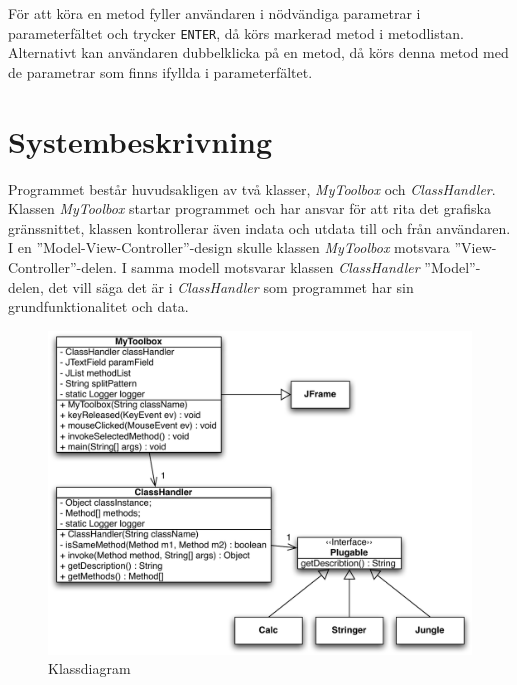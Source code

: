 \documentclass[a4paper, 12pt]{article}
\begin{document}
För att köra en metod fyller användaren i nödvändiga parametrar i
parameterfältet och trycker \verb!ENTER!, då körs markerad metod i
metodlistan. Alternativt kan användaren dubbelklicka på en metod, då
körs denna metod med de parametrar som finns ifyllda i
parameterfältet.

\section{Systembeskrivning}
Programmet består huvudsakligen av två klasser, \textit{MyToolbox} och
\textit{ClassHandler}. Klassen \textit{MyToolbox} startar programmet
och har ansvar för att rita det grafiska gränssnittet, klassen
kontrollerar även indata och utdata till och från användaren. I en
''Model-View-Controller''-design skulle klassen \textit{MyToolbox}
motsvara ''View-Controller''-delen. I samma modell motsvarar klassen
\textit{ClassHandler} ''Model''-delen, det vill säga det är i
\textit{ClassHandler} som programmet har sin grundfunktionalitet och
data.

\begin{figure}[H]
  \begin{center}
    \includegraphics[width=130mm]{images/class.pdf}
    \caption{Klassdiagram}
    \label{fig:class}
  \end{center}
\end{figure}
\end{document}
